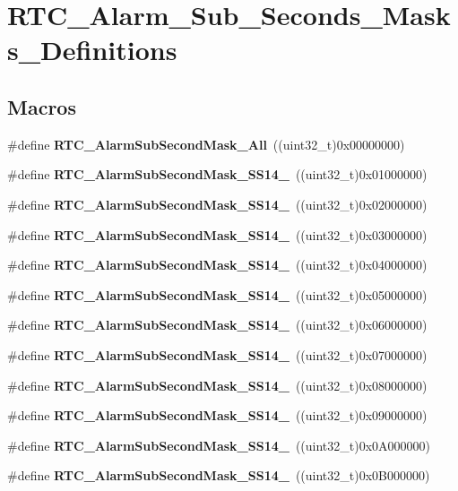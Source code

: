 \section{R\+T\+C\+\_\+\+Alarm\+\_\+\+Sub\+\_\+\+Seconds\+\_\+\+Masks\+\_\+\+Definitions}
\label{group__RTC__Alarm__Sub__Seconds__Masks__Definitions}
\subsection*{Macros}
\begin{DoxyCompactItemize}
\item 
\#define \textbf{ R\+T\+C\+\_\+\+Alarm\+Sub\+Second\+Mask\+\_\+\+All}~((uint32\+\_\+t)0x00000000)
\item 
\#define \textbf{ R\+T\+C\+\_\+\+Alarm\+Sub\+Second\+Mask\+\_\+\+S\+S14\+\_}~((uint32\+\_\+t)0x01000000)
\item 
\#define \textbf{ R\+T\+C\+\_\+\+Alarm\+Sub\+Second\+Mask\+\_\+\+S\+S14\+\_}~((uint32\+\_\+t)0x02000000)
\item 
\#define \textbf{ R\+T\+C\+\_\+\+Alarm\+Sub\+Second\+Mask\+\_\+\+S\+S14\+\_}~((uint32\+\_\+t)0x03000000)
\item 
\#define \textbf{ R\+T\+C\+\_\+\+Alarm\+Sub\+Second\+Mask\+\_\+\+S\+S14\+\_}~((uint32\+\_\+t)0x04000000)
\item 
\#define \textbf{ R\+T\+C\+\_\+\+Alarm\+Sub\+Second\+Mask\+\_\+\+S\+S14\+\_}~((uint32\+\_\+t)0x05000000)
\item 
\#define \textbf{ R\+T\+C\+\_\+\+Alarm\+Sub\+Second\+Mask\+\_\+\+S\+S14\+\_}~((uint32\+\_\+t)0x06000000)
\item 
\#define \textbf{ R\+T\+C\+\_\+\+Alarm\+Sub\+Second\+Mask\+\_\+\+S\+S14\+\_}~((uint32\+\_\+t)0x07000000)
\item 
\#define \textbf{ R\+T\+C\+\_\+\+Alarm\+Sub\+Second\+Mask\+\_\+\+S\+S14\+\_}~((uint32\+\_\+t)0x08000000)
\item 
\#define \textbf{ R\+T\+C\+\_\+\+Alarm\+Sub\+Second\+Mask\+\_\+\+S\+S14\+\_}~((uint32\+\_\+t)0x09000000)
\item 
\#define \textbf{ R\+T\+C\+\_\+\+Alarm\+Sub\+Second\+Mask\+\_\+\+S\+S14\+\_}~((uint32\+\_\+t)0x0\+A000000)
\item 
\#define \textbf{ R\+T\+C\+\_\+\+Alarm\+Sub\+Second\+Mask\+\_\+\+S\+S14\+\_}~((uint32\+\_\+t)0x0\+B000000)
\item 

\end{DoxyCompactItemize}
